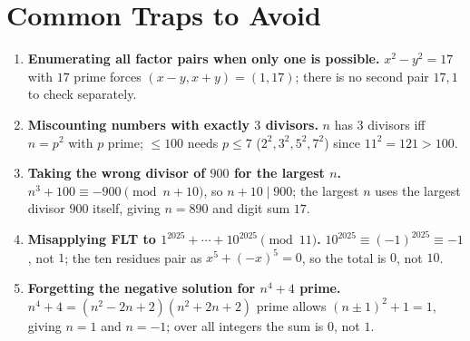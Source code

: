 \documentclass[11pt,a4paper]{article}
\begin{document}
\section*{Common Traps to Avoid}

\begin{enumerate}[leftmargin=2em, itemsep=4pt]
  \item \textbf{Enumerating all factor pairs when only one is possible.}
        $x^{2}-y^{2}=17$ with $17$ prime forces $(x-y,x+y)=(1,17)$; there is no second pair $17,1$ to check separately. 
  \item \textbf{Miscounting numbers with exactly $3$ divisors.}
        $n$ has $3$ divisors iff $n=p^{2}$ with $p$ prime; $\le100$ needs $p\le7$ ($2^{2},3^{2},5^{2},7^{2}$) since $11^{2}=121>100$. 
  \item \textbf{Taking the wrong divisor of $900$ for the largest $n$.}
        $n^{3}+100\equiv-900\pmod{n+10}$, so $n+10\mid900$; the largest $n$ uses the largest divisor $900$ itself, giving $n=890$ and digit sum $17$. 
  \item \textbf{Misapplying FLT to $1^{2025}+\cdots+10^{2025}\pmod{11}$.}
        $10^{2025}\equiv(-1)^{2025}\equiv-1$, not $1$; the ten residues pair as $x^{5}+(-x)^{5}=0$, so the total is $0$, not $10$. 
  \item \textbf{Forgetting the negative solution for $n^{4}+4$ prime.}
        $n^{4}+4=(n^{2}-2n+2)(n^{2}+2n+2)$ prime allows $(n\pm1)^{2}+1=1$, giving $n=1$ and $n=-1$; over all integers the sum is $0$, not $1$. 
\end{enumerate}

\end{document}
